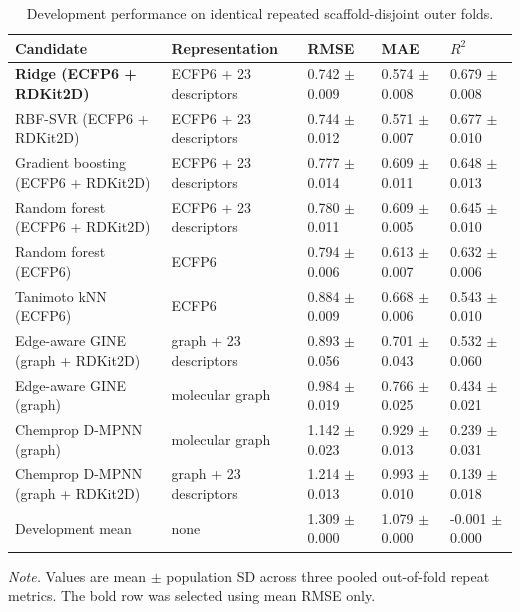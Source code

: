 \begin{table}[t]
\centering
\caption{Development performance on identical repeated scaffold-disjoint outer folds.}
\label{tab:model-comparison}
\scriptsize
\setlength{\tabcolsep}{3.5pt}
\begin{tabular}{L{0.29\textwidth}L{0.21\textwidth}R{0.14\textwidth}R{0.14\textwidth}R{0.14\textwidth}}
\toprule
\textbf{Candidate} & \textbf{Representation} & \textbf{RMSE} & \textbf{MAE} & \textbf{$R^2$} \\
\midrule
\textbf{Ridge (ECFP6 + RDKit2D)} & ECFP6 + 23 descriptors & 0.742 $\pm$ 0.009 & 0.574 $\pm$ 0.008 & 0.679 $\pm$ 0.008 \\
RBF-SVR (ECFP6 + RDKit2D) & ECFP6 + 23 descriptors & 0.744 $\pm$ 0.012 & 0.571 $\pm$ 0.007 & 0.677 $\pm$ 0.010 \\
Gradient boosting (ECFP6 + RDKit2D) & ECFP6 + 23 descriptors & 0.777 $\pm$ 0.014 & 0.609 $\pm$ 0.011 & 0.648 $\pm$ 0.013 \\
Random forest (ECFP6 + RDKit2D) & ECFP6 + 23 descriptors & 0.780 $\pm$ 0.011 & 0.609 $\pm$ 0.005 & 0.645 $\pm$ 0.010 \\
Random forest (ECFP6) & ECFP6 & 0.794 $\pm$ 0.006 & 0.613 $\pm$ 0.007 & 0.632 $\pm$ 0.006 \\
Tanimoto kNN (ECFP6) & ECFP6 & 0.884 $\pm$ 0.009 & 0.668 $\pm$ 0.006 & 0.543 $\pm$ 0.010 \\
Edge-aware GINE (graph + RDKit2D) & graph + 23 descriptors & 0.893 $\pm$ 0.056 & 0.701 $\pm$ 0.043 & 0.532 $\pm$ 0.060 \\
Edge-aware GINE (graph) & molecular graph & 0.984 $\pm$ 0.019 & 0.766 $\pm$ 0.025 & 0.434 $\pm$ 0.021 \\
Chemprop D-MPNN (graph) & molecular graph & 1.142 $\pm$ 0.023 & 0.929 $\pm$ 0.013 & 0.239 $\pm$ 0.031 \\
Chemprop D-MPNN (graph + RDKit2D) & graph + 23 descriptors & 1.214 $\pm$ 0.013 & 0.993 $\pm$ 0.010 & 0.139 $\pm$ 0.018 \\
Development mean & none & 1.309 $\pm$ 0.000 & 1.079 $\pm$ 0.000 & -0.001 $\pm$ 0.000 \\
\bottomrule
\end{tabular}
\par\vspace{3pt}\parbox{0.94\textwidth}{\footnotesize \textit{Note.} Values are mean $\pm$ population SD across three pooled out-of-fold repeat metrics. The bold row was selected using mean RMSE only.}
\end{table}
